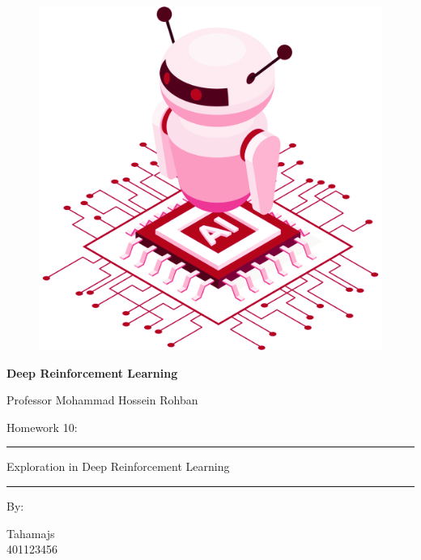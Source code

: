 \documentclass[12pt]{article}
\begin{document}
\thispagestyle{plain}

\begin{center}

\vspace*{-1.5cm}
\begin{figure}[!h]
    \centering
    \includegraphics[width=0.7\linewidth]{figs/cover-std.png}
\end{figure}

{

{\color{DarkBlue} {\fontsize{30}{50} \textbf{
Deep Reinforcement Learning
}}}

{\color{DarkBlue} {\Large
Professor Mohammad Hossein Rohban
}}
}


\vspace{20pt}

{


{\color{RedOrange}
{\Large
Homework 10:
}\\
}
{\color{BrickRed}
\rule{12cm}{0.5pt}

{\Huge
Exploration in Deep Reinforcement Learning
}
\rule{12cm}{0.5pt}
}

\vspace{10pt}

{\color{RoyalPurple} { \small By:} } \\
\vspace{10pt}

{\color{Blue} { \LARGE Tahamajs } } \\
\vspace{5pt}
{\color{RoyalBlue} { \Large 401123456 } }


}
\end{center}
\end{document}
